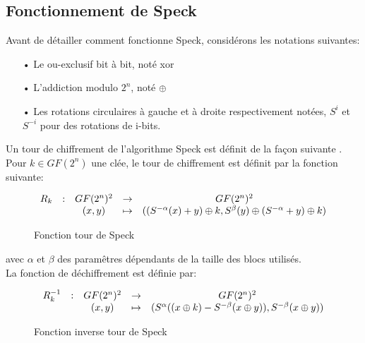 	\subsection{Fonctionnement de Speck}

		Avant de détailler comment fonctionne Speck, considérons les notations suivantes:

		\begin{enumerate}
		  \item[•] Le ou-exclusif bit à bit, noté xor
		  \item[•] L'addiction modulo $2^n$, noté $\mathbin{\oplus}$
		  \item[•] Les rotations circulaires à gauche et à droite respectivement notées,
		    $S^i$ et $S^{-i}$ pour des rotations de i-bits.
		\end{enumerate}

		Un tour de chiffrement de l'algorithme Speck est définit de la façon suivante \cite{speck_families}. \\
		Pour $k \in GF(2^n)$ une clée, le tour de chiffrement est définit par la fonction suivante:

		\begin{figure}[H]
			\centering
			\[
			\begin{array}{ccccc}
			R_k & : & GF(2^n)^2 & \to & GF(2^n)^2 \\
			 & & (x,y) & \mapsto & ((S^{-\alpha}(x) + y) \mathbin{\oplus} k, S^\beta (y) \mathbin{\oplus} (S^{-\alpha} + y) \mathbin{\oplus} k) \\
			\end{array}
			\]
			\caption{Fonction tour de Speck}
			\label{tourSpeck}
		\end{figure}



		avec $\alpha$ et $\beta$ des paramêtres dépendants de la taille des blocs utilisés. \\

		La fonction de déchiffrement est définie par:

		\begin{figure}[H]
			\centering
			\[
			\begin{array}{ccccc}
			R_k^{-1} & : & GF(2^n)^2 & \to & GF(2^n)^2 \\
			 & & (x,y) & \mapsto & (S^\alpha ((x \mathbin{\oplus} k) - S^{-\beta}(x \mathbin{\oplus} y)), S^{-\beta}(x \mathbin{\oplus} y)) \\
			\end{array}
			\]
			\caption{Fonction inverse tour de Speck}
			\label{tourSpeck}
		\end{figure}


